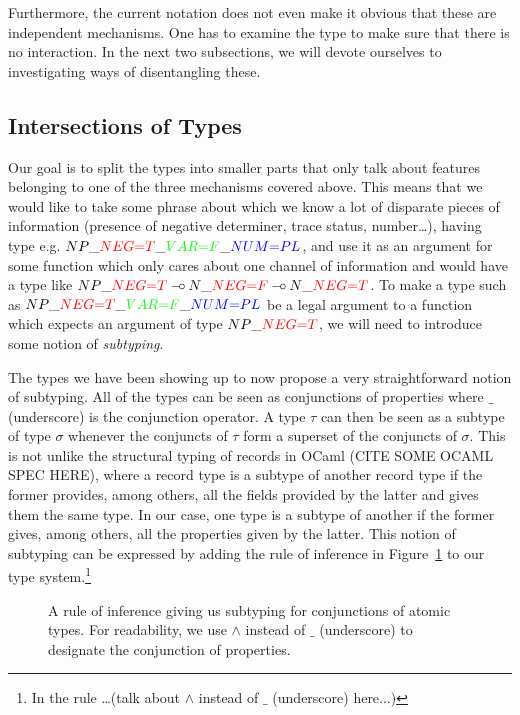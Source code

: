 Furthermore, the current notation does not even make it obvious that
these are independent mechanisms. One has to examine the type to make
sure that there is no interaction. In the next two subsections, we will
devote ourselves to investigating ways of disentangling these.


\subsection{Intersections of Types}

Our goal is to split the types into smaller parts that only talk about
features belonging to one of the three mechanisms covered above. This
means that we would like to take some phrase about which we know a lot
of disparate pieces of information (presence of negative determiner,
trace status, number\ldots), having type
e.g. $NP\_\textcolor{red}{NEG{=}T}\_\textcolor{green}{VAR{=}F}\_\textcolor{blue}{NUM{=}PL}$,
and use it as an argument for some function which only cares about one
channel of information and would have a type like
$NP\_\textcolor{red}{NEG{=}T} \limp N\_\textcolor{red}{NEG{=}F} \limp
N\_\textcolor{red}{NEG{=}T}$. To make a type such as
$NP\_\textcolor{red}{NEG{=}T}\_\textcolor{green}{VAR{=}F}\_\textcolor{blue}{NUM{=}PL}$
be a legal argument to a function which expects an argument of type
$NP\_\textcolor{red}{NEG{=}T}$, we will need to introduce some notion of
\emph{subtyping}.

The types we have been showing up to now propose a very straightforward
notion of subtyping. All of the types can be seen as conjunctions of
properties where $\_$ (underscore) is the conjunction operator. A type
$\tau$ can then be seen as a subtype of type $\sigma$ whenever the
conjuncts of $\tau$ form a superset of the conjuncts of $\sigma$. This
is not unlike the structural typing of records in OCaml (CITE SOME OCAML
SPEC HERE), where a record type is a subtype of another record type if
the former provides, among others, all the fields provided by the latter
and gives them the same type. In our case, one type is a subtype of
another if the former gives, among others, all the properties given by
the latter. This notion of subtyping can be expressed by adding the rule
of inference in Figure~\ref{fig:type-superset} to our type
system.\footnote{In the rule \ldots (talk about $\land$ instead of $\_$
  (underscore) here...)}

\begin{figure}
  \begin{prooftree}
  \end{prooftree}
  \caption{\label{fig:type-superset} A rule of inference giving us
    subtyping for conjunctions of atomic types. For readability, we use
    $\land$ instead of $\_$ (underscore) to designate the conjunction of
    properties.}
\end{figure}


